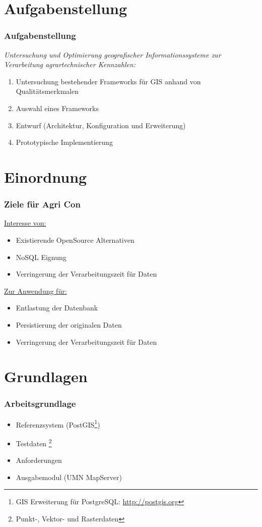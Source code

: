 \documentclass{beamer}
\begin{document}
\section{Aufgabenstellung}
\begin{frame}\frametitle{Aufgabenstellung}
\textit{Untersuchung und Optimierung geografischer Informationssysteme zur Verarbeitung agrartechnischer Kennzahlen:}\\

\begin{enumerate} %
\item Untersuchung bestehender Frameworks für GIS anhand von Qualitätsmerkmalen
\item Auswahl eines Frameworks
\item Entwurf (Architektur, Konfiguration und Erweiterung)
\item Prototypische Implementierung %
\end{enumerate}
\end{frame}

\section{Einordnung}
\begin{frame}\frametitle{Ziele für Agri Con} 
\underline{Interesse von:}\\
\begin{itemize}
\item Existierende OpenSource Alternativen
\item NoSQL Eignung
\item Verringerung der Verarbeitungszeit für Daten
\end{itemize}

\underline{Zur Anwendung für:}\\
\begin{itemize}
\item Entlastung der Datenbank
\item Persistierung der originalen Daten
\item Verringerung der Verarbeitungszeit für Daten
\end{itemize}
\end{frame}

\section{Grundlagen}
\begin{frame}\frametitle{Arbeitsgrundlage} 
\begin{itemize}
\item Referenzsystem (PostGIS\footnote{GIS Erweiterung für PostgreSQL: \url{http://postgis.org}}) %
\item Testdaten \footnote{Punkt-, Vektor- und Rasterdaten}

\item Anforderungen
\item Ausgabemodul (UMN MapServer)
\end{itemize}
\end{frame}
\end{document}
